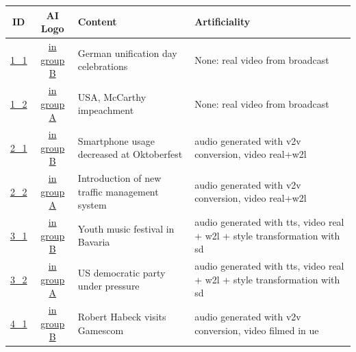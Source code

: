 \documentclass[
  a4paper,  %
  twoside,  %
  bibliography=totoc,
  headsepline,
  cleardoublepage=empty,
  parskip=half,
  draft=false
]{scrbook}
\begin{document}
\begin{table}[h]
  \centering
  \begin{tabularx}{\linewidth}{c|c|X|X}
    \textbf{ID} & \textbf{AI Logo} & \textbf{Content} & \textbf{Artificiality}\\
    \midrule
    \href{https://drive.google.com/file/d/1wcgWiW07UWrh86xQaXqI0sc28WZoUlfj/view?usp=share_link}{1\_1} & \href{https://drive.google.com/file/d/1vB1aURRvoK19eWnzxmmBOS2HCp-MjvKG/view?usp=share_link}{in group B} & German unification day celebrations  & None: real video from broadcast \\
    \midrule
    \href{https://drive.google.com/file/d/1v2xDAOfhbPYudOGWFJGO_xGYwP5vcHD0/view?usp=share_link}{1\_2} & \href{https://drive.google.com/file/d/1eXjPoj32xWEWbeymlHlph6d1Er2pc0WT/view?usp=share_link}{in group A} & USA, McCarthy impeachment  & None: real video from broadcast \\
    \midrule
    \href{https://drive.google.com/file/d/1i9nGNuGLOpDQmDQ60ly6cXq_vwZerJUP/view?usp=sharing}{2\_1} & \href{https://drive.google.com/file/d/1MmLkxeuh8KvpInd3sAHWBUcjQTFfkLzo/view?usp=share_link}{in group B} & Smartphone usage decreased at Oktoberfest  & audio generated with \gls{v2v} conversion, video real+\gls{w2l} \\
    \midrule
    \href{https://drive.google.com/file/d/1uXVBxHgECmuQo0oYX_BEmDxBNMcCYRTt/view?usp=share_link}{2\_2} & \href{https://drive.google.com/file/d/1_XvS9ArS9ogeXNdpFXv_Y6kZvNhNbimM/view?usp=sharing}{in group A} & Introduction of new traffic management system  & audio generated with \gls{v2v} conversion, video real+\gls{w2l} \\
    \midrule
    \href{https://drive.google.com/file/d/1C62Fnwb2atoN66t6Bl5uo_RcMP1nEs04/view?usp=sharing}{3\_1} & \href{https://drive.google.com/file/d/1nlbBbndJvaUuxNYil-YdBl5RuEwqeZGO/view?usp=share_link}{in group B} & Youth music festival in Bavaria  & audio generated with \gls{tts}, video real + \gls{w2l} + style transformation with \gls{sd} \\
    \midrule
    \href{https://drive.google.com/file/d/193I_oJy46oyUWqAIpUUqwf0jJGURJfCH/view?usp=sharing}{3\_2} & \href{https://drive.google.com/file/d/1gN-h4__XSaG30pxgavr3Vki7do5z8Uzn/view?usp=sharing}{in group A} & US democratic party under pressure  & audio generated with \gls{tts}, video real + \gls{w2l} + style transformation with \gls{sd} \\
    \midrule
    \href{https://drive.google.com/file/d/1zpXDmkjIZmsndkNYb958O0d7xYyP-_Xg/view?usp=sharing}{4\_1} & \href{https://drive.google.com/file/d/1M8CdJttsTBFL8V8AzIyQ5oTx4RoZrxNi/view?usp=sharing}{in group B} & Robert Habeck visits Gamescom  & audio generated with \gls{v2v} conversion, video filmed in \gls{ue} \\

\end{tabularx}
\end{table}
\end{document}
